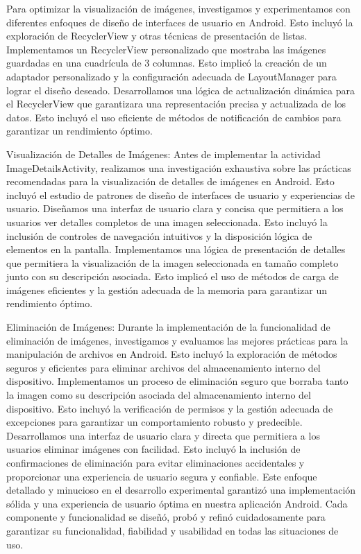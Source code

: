 \documentclass[conference]{IEEEtran}
\begin{document}
Para optimizar la visualización de imágenes, investigamos y experimentamos con diferentes enfoques de diseño de interfaces de usuario en Android. Esto incluyó la exploración de RecyclerView y otras técnicas de presentación de listas.
Implementamos un RecyclerView personalizado que mostraba las imágenes guardadas en una cuadrícula de 3 columnas. Esto implicó la creación de un adaptador personalizado y la configuración adecuada de LayoutManager para lograr el diseño deseado.
Desarrollamos una lógica de actualización dinámica para el RecyclerView que garantizara una representación precisa y actualizada de los datos. Esto incluyó el uso eficiente de métodos de notificación de cambios para garantizar un rendimiento óptimo.

Visualización de Detalles de Imágenes:
Antes de implementar la actividad ImageDetailsActivity, realizamos una investigación exhaustiva sobre las prácticas recomendadas para la visualización de detalles de imágenes en Android. Esto incluyó el estudio de patrones de diseño de interfaces de usuario y experiencias de usuario.
Diseñamos una interfaz de usuario clara y concisa que permitiera a los usuarios ver detalles completos de una imagen seleccionada. Esto incluyó la inclusión de controles de navegación intuitivos y la disposición lógica de elementos en la pantalla.
Implementamos una lógica de presentación de detalles que permitiera la visualización de la imagen seleccionada en tamaño completo junto con su descripción asociada. Esto implicó el uso de métodos de carga de imágenes eficientes y la gestión adecuada de la memoria para garantizar un rendimiento óptimo.

Eliminación de Imágenes:
Durante la implementación de la funcionalidad de eliminación de imágenes, investigamos y evaluamos las mejores prácticas para la manipulación de archivos en Android. Esto incluyó la exploración de métodos seguros y eficientes para eliminar archivos del almacenamiento interno del dispositivo.
Implementamos un proceso de eliminación seguro que borraba tanto la imagen como su descripción asociada del almacenamiento interno del dispositivo. Esto incluyó la verificación de permisos y la gestión adecuada de excepciones para garantizar un comportamiento robusto y predecible.
Desarrollamos una interfaz de usuario clara y directa que permitiera a los usuarios eliminar imágenes con facilidad. Esto incluyó la inclusión de confirmaciones de eliminación para evitar eliminaciones accidentales y proporcionar una experiencia de usuario segura y confiable.
Este enfoque detallado y minucioso en el desarrollo experimental garantizó una implementación sólida y una experiencia de usuario óptima en nuestra aplicación Android. Cada componente y funcionalidad se diseñó, probó y refinó cuidadosamente para garantizar su funcionalidad, fiabilidad y usabilidad en todas las situaciones de uso.
\end{document}

